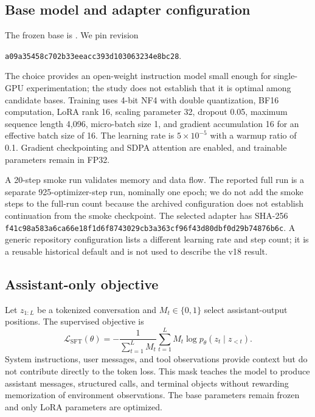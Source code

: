 \documentclass[11pt]{article}
\begin{document}
\subsection{Base model and adapter configuration}

The frozen base is . We pin revision
\begin{center}
\small\nolinkurl{a09a35458c702b33eeacc393d103063234e8bc28}.
\end{center}
The choice provides an open-weight instruction model small enough for single-GPU experimentation; the study does not establish that it is optimal among candidate bases. Training uses 4-bit NF4 with double quantization, BF16 computation, LoRA rank 16, scaling parameter 32, dropout 0.05, maximum sequence length 4,096, micro-batch size 1, and gradient accumulation 16 for an effective batch size of 16. The learning rate is $5\times10^{-5}$ with a warmup ratio of 0.1. Gradient checkpointing and SDPA attention are enabled, and trainable parameters remain in FP32.

A 20-step smoke run validates memory and data flow. The reported full run is a separate 925-optimizer-step run, nominally one epoch; we do not add the smoke steps to the full-run count because the archived configuration does not establish continuation from the smoke checkpoint. The selected adapter has SHA-256 \nolinkurl{f41c98a583a6ca66e18f1d6f8743029cb3a363cf96f43d80dbf0d29b74876b6c}. A generic repository configuration lists a different learning rate and step count; it is a reusable historical default and is not used to describe the v18 result.

\subsection{Assistant-only objective}

Let $z_{1:L}$ be a tokenized conversation and $M_t\in\{0,1\}$ select assistant-output positions. The supervised objective is
\begin{equation}
\mathcal{L}_{\mathrm{SFT}}(\theta) =
-\frac{1}{\sum_{t=1}^{L} M_t}
\sum_{t=1}^{L} M_t\log p_\theta(z_t\mid z_{<t}).
\label{eq:sft}
\end{equation}
System instructions, user messages, and tool observations provide context but do not contribute directly to the token loss. This mask teaches the model to produce assistant messages, structured calls, and terminal objects without rewarding memorization of environment observations. The base parameters remain frozen and only LoRA parameters are optimized.
\end{document}
